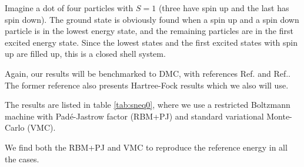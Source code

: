 Imagine a dot of four particles with $S=1$ (three have spin up and the last has spin down). The ground state is obviously found when a spin up and a spin down particle is in the lowest energy state, and the remaining particles are in the first excited energy state. Since the lowest states and the first excited states with spin up are filled up, this is a closed shell system.

Again, our results will be benchmarked to DMC, with references Ref.\cite{pederiva_diffusion_1999} and Ref.\cite{ghosal_incipient_2007}. The former reference also presents Hartree-Fock results which we also will use. 

The results are listed in table \eqref{tab:sneq0}, where we use a restricted Boltzmann machine with Padé-Jastrow factor (RBM+PJ) and standard variational Monte-Carlo (VMC). 

We find both the RBM+PJ and VMC to reproduce the reference energy in all the cases. 

